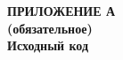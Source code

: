 \begin{center}
  \textbf{
  \MakeUppercase{Приложение А}\\
  (обязательное)\\
  Исходный код}
\end{center}

% 

